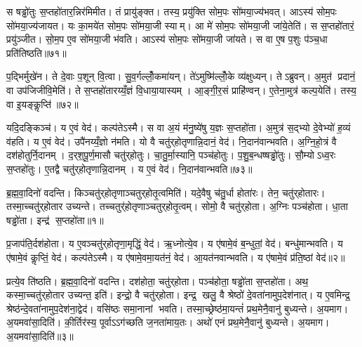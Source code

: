 स षड्ढो॑तुः स॒प्तहो॑तार॒न्निर॑मिमीत। तं प्रायु॑ङ्क्त। तस्य॒ प्रयु॑क्ति सोम॒पः सो॑मया॒ज्य॑भवत्। आऽस्य॑ सोम॒पः सो॑मया॒ज्य॑जायत। यः का॒मये॑त सोम॒पः सो॑मया॒जी स्याम्। आ मे॑ सोम॒पः सो॑मया॒जी जा॑ये॒तेति॑। स स॒प्तहो॑तारं॒ प्रयु॑ञ्जीत। सो॒म॒प ए॒व सो॑मया॒जी भ॑वति। आऽस्य॑ सोम॒पः सो॑मया॒जी जा॑यते। स वा ए॒ष प॒शुः प॑ञ्च॒धा प्रति॑तिष्ठति॥७१॥

प॒द्भिर्मुखे॑न। ते दे॒वाः प॒शून् वि॒त्वा। सु॒व॒र्गल्लोँ॒कमा॑यन्। ते॑ऽमुष्मि॑ल्लोँ॒के व्य॑क्षुध्यन्। तेऽब्रुवन्। अ॒मुत॑ प्रदानं॒ वा उप॑जिजीवि॒मेति॑। ते स॒प्तहो॑तारय्यँ॒ज्ञं वि॒धाया॒यास्यम्। आ॒ङ्गी॒र॒सं प्राहि॑ण्वन्। ए॒तेना॒मुत्र॑ कल्प॒येति॑। तस्य॒ वा इ॒यङ्कॢप्ति॑॥७२॥

यदि॒दङ्किञ्च॑। य ए॒वं वेद॑। कल्प॑तेऽस्मै। स वा अ॒यं म॑नु॒ष्ये॑षु य॒ज्ञः स॒प्तहो॑ता। अ॒मुत्र॑ स॒द्भ्यो दे॒वेभ्यो॑ ह॒व्यं व॑हति। य ए॒वं वेद॑। उपै॑नय्यँ॒ज्ञो न॑मति। यो वै चतु॑र्‌होतृणान्नि॒दानं॒ वेद॑। नि॒दान॑वान्भवति। अ॒ग्नि॒हो॒त्रं वै दश॑होतुर्नि॒दानम्। द॒र्‌श॒पू॒र्ण॒मासौ चतु॑र्‌होतुः। चा॒तु॒र्मा॒स्यानि॒ पञ्च॑होतुः। प॒शु॒ब॒न्धष्षड्ढो॑तुः। सौ॒म्योऽध्व॒रः स॒प्तहो॑तुः। ए॒तद्वै चतु॑र्‌होतृणान्नि॒दानम्। य ए॒वं वेद॑। नि॒दान॑वान्भवति॥७३॥



\clearpage
{}
\setcounter{anuvakam}{0}
ब्र॒ह्म॒वा॒दिनो॑ वदन्ति। किञ्चतु॑र्‌होतृणाञ्चतुर्‌होतृ॒त्वमिति॑। यदे॒वैषु च॑तु॒र्धा होता॑रः। तेन॒ चतु॑र्‌होतारः। तस्मा॒च्चतु॑र्‌होतार उच्यन्ते। तच्चतुर्॑होतृणाञ्चतुर्‌होतृ॒त्वम्। सोमो॒ वै चतु॑र्‌होता। अ॒ग्निः पञ्च॑होता। धा॒ता षड्ढो॑ता। इन्द्र॑ स॒प्तहो॑ता॥१॥

प्र॒जाप॑ति॒र्दश॑होता। य ए॒वञ्चतु॑र्‌होतृणा॒मृद्धिं॒ वेद॑। ऋ॒ध्नोत्ये॒व। य ए॑षामे॒वं ब॒न्धुतां॒ वेद॑। बन्धु॑मान्भवति। य ए॑षामे॒वं कॢप्तिं॒ वेद॑। कल्प॑तेऽस्मै। य ए॑षामे॒वमा॒यत॑नं॒ वेद॑। आ॒यत॑नवान्भवति। य ए॑षामे॒वं प्र॑ति॒ष्ठां वेद॑॥२॥

प्रत्ये॒व ति॑ष्ठति। ब्र॒ह्म॒वा॒दिनो॑ वदन्ति। दश॑होता॒ चतु॑र्‌होता। पञ्च॑होता॒ षड्ढो॑ता स॒प्तहो॑ता। अथ॒ कस्मा॒च्चतु॑र्‌होतार उच्यन्त॒ इति॑। इन्द्रो॒ वै चतु॑र्‌होता। इन्द्र॒ खलु॒ वै श्रेष्ठो॑ दे॒वता॑नामुप॒देश॑नात्। य ए॒वमिन्द्र॒ श्रेष्ठ॑न्दे॒वता॑नामुप॒देश॑ना॒द्वेद॑। वसि॑ष्ठः समा॒नानां भवति। तस्मा॒च्छ्रेष्ठ॑मा॒यन्तं॑ प्रथ॒मेनै॒वानु॑ बुध्यन्ते। अ॒यमाग\sn{}। अ॒यमवा॑सा॒दिति॑। की॒र्तिर॑स्य॒ पूर्वाऽऽग॑च्छति ज॒नता॑माय॒तः। अथो॑ एनं प्रथ॒मेनै॒वानु॑ बुध्यन्ते। अ॒यमाग\sn{}। अ॒यमवा॑सा॒दिति॑॥३॥\anuvakamend[स॒प्तहो॑ता प्रति॒ष्ठां वेद॑ बुध्यन्ते॒ षट्च॑]

